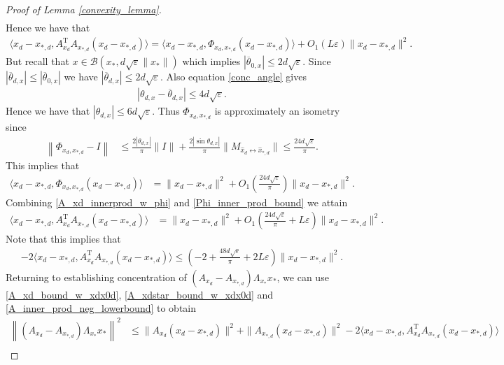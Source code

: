 \documentclass[11pt]{article}
\renewcommand{\epsilon}{\varepsilon}
\renewcommand{\top}{{\mathrm{T}}}
\theoremstyle{remark}
\begin{document}
\begin{proof}[Proof of Lemma \ref{convexity_lemma}]
\begin{align*}
\end{align*} Hence we have that \begin{align}
   \langle x_d - x_{*,d},A_{x_d}^\top A_{x_{*,d}}(x_d - x_{*,d})\rangle = \langle x_d - x_{*,d},\Phi_{x_d,x_{*,d}}(x_d - x_{*,d})\rangle + O_1(L\epsilon) \|x_d - x_{*,d}\|^2. \label{A_xd_innerprod_w_phi}
\end{align} But recall that $x \in \mathcal{B}(x_*,d\sqrt{\epsilon}\|x_*\|)$ which implies $ |\overline{\theta}_{0,x}| \leqslant 2d\sqrt{\epsilon}$. Since  $|\overline{\theta}_{d,x}| \leqslant |\overline{\theta}_{0,x}|$ we have $|\overline{\theta}_{d,x}| \leqslant 2d\sqrt{\epsilon}$. Also equation \eqref{conc_angle} gives \begin{align*}
    |\theta_{d,x} - \overline{\theta}_{d,x}| \leqslant 4d\sqrt{\epsilon}.
\end{align*} Hence we have that $|\theta_{d,x}| \leqslant 6d\sqrt{\epsilon}.$ Thus $\Phi_{x_d,x_{*,d}}$ is approximately an isometry since \begin{align*}
    \left\|\Phi_{x_d,x_{*,d}} - I\right\| & \leqslant \frac{2|\theta_{d,x}|}{\pi}\|I\| + \frac{2|\sin \theta_{d,x}|}{\pi}\|M_{\hat{x}_d \leftrightarrow \hat{x}_{*,d}}\| \leqslant \frac{24d\sqrt{\epsilon}}{\pi}.
\end{align*} This implies that \begin{align}
    \langle x_d - x_{*,d},\Phi_{x_d,x_{*,d}}(x_d - x_{*,d})\rangle & = \|x_d - x_{*,d}\|^2 + O_1\left(\frac{24d\sqrt{\epsilon}}{\pi}\right)\|x_d - x_{*,d}\|^2. \label{Phi_inner_prod_bound}
\end{align} Combining \eqref{A_xd_innerprod_w_phi} and \eqref{Phi_inner_prod_bound} we attain \begin{align*}
    \langle x_d - x_{*,d},A_{x_d}^\top A_{x_{*,d}}(x_d - x_{*,d})\rangle & = \|x_d - x_{*,d}\|^2 + O_1\left(\frac{24d\sqrt{\epsilon}}{\pi}+ L\epsilon\right)\|x_d - x_{*,d}\|^2.
\end{align*} Note that this implies that \begin{align}
    -2\langle x_d - x_{*,d},A_{x_d}^\top A_{x_{*,d}}(x_d - x_{*,d})\rangle \leqslant \left(-2 +\frac{48d\sqrt{\epsilon}}{\pi}+ 2L\epsilon\right)\|x_d - x_{*,d}\|^2. \label{A_inner_prod_neg_lowerbound}
\end{align} Returning to establishing concentration of $(A_{x_d} - A_{x_{*,d}})\Lambda_{x_*}x_*$, we can use \eqref{A_xd_bound_w_xdx0d}, \eqref{A_xdstar_bound_w_xdx0d} and \eqref{A_inner_prod_neg_lowerbound} to obtain \begin{align*}
    \left\|(A_{x_d} - A_{x_{*,d}})\Lambda_{x_*}x_*\right\|^2 & \leqslant \|A_{x_d}(x_d - x_{*,d})\|^2 + \|A_{x_{*,d}}(x_d - x_{*,d})\|^2 - 2\langle x_d - x_{*,d},A_{x_d}^\top A_{x_{*,d}}(x_d - x_{*,d})\rangle \\

\end{align*}
\end{proof}
\end{document}
